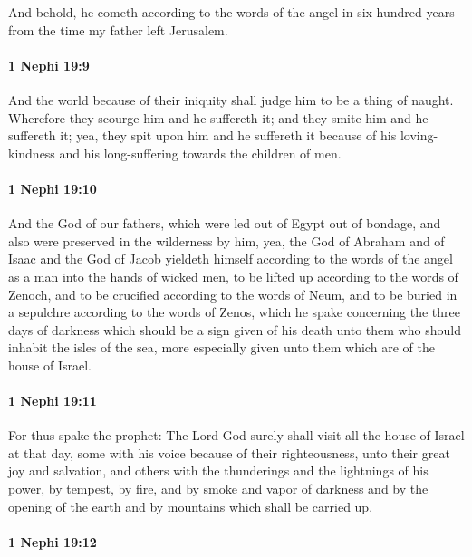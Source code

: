 			And behold, he cometh according to the words of the angel
			in six hundred years from the time my father left Jerusalem.

		\paragraph{1 Nephi 19:9} %
			\label{1NEPHI-19-9}

			And the world because of their iniquity shall judge him to be a thing of naught.
			Wherefore they scourge him and he suffereth it;
			and they smite him and he suffereth it;
			yea, they spit upon him and he suffereth it
			because of his loving-kindness and his long-suffering towards the children of men.

		\paragraph{1 Nephi 19:10} %
			\label{1NEPHI-19-10}

			And the God of our fathers, which were led out of Egypt out of bondage,
			and also were preserved in the wilderness by him,
			yea, the God of Abraham and of Isaac and the God of Jacob yieldeth himself
			according to the words of the angel
			as a man into the hands of wicked men,
			to be lifted up according to the words of Zenoch,
			and to be crucified according to the words of Neum,
			and to be buried in a sepulchre according to the words of Zenos,
			which he spake concerning the three days of darkness
			which should be a sign given of his death unto them
			who should inhabit the isles of the sea,
			more especially given unto them which are of the house of Israel.

		\paragraph{1 Nephi 19:11} %
			\label{1NEPHI-19-11}

			For thus spake the prophet:
			The Lord God surely shall visit all the house of Israel at that day,
			some with his voice because of their righteousness,
			unto their great joy and salvation,
			and others with the thunderings and the lightnings of his power,
			by tempest, by fire, and by smoke and vapor of darkness
			and by the opening of the earth
			and by mountains which shall be carried up.

		\paragraph{1 Nephi 19:12} %
			\label{1NEPHI-19-12}

